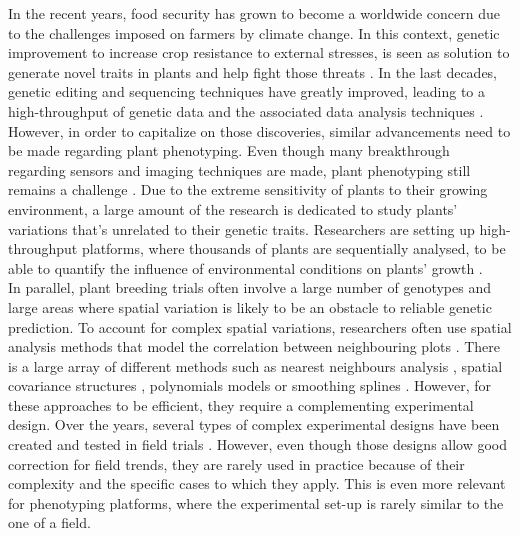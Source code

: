 
In the recent years, food security has grown to become a worldwide concern due to the challenges imposed on farmers by climate change. 
In this context, genetic improvement to increase crop resistance to external stresses, is seen as solution to generate novel traits in plants and help fight those threats \parencite{tester2010breeding}. 
In the last decades, genetic editing and sequencing techniques have greatly improved, leading to a high-throughput of genetic data and the associated data analysis techniques \parencite{schiml2016revolutionizing}. 
However, in order to capitalize on those discoveries, similar advancements need to be made regarding plant phenotyping. 
Even though many breakthrough regarding sensors and imaging techniques are made, plant phenotyping still remains a challenge \parencite{furbank_phenomics_2011}. Due to the extreme sensitivity of plants to their growing environment, a large amount of the research is dedicated to study plants' variations that's unrelated to their genetic traits. Researchers are setting up high-throughput platforms, where thousands of plants are sequentially analysed, to be able to quantify the influence of environmental conditions on plants' growth \parencite{tardieu_plant_2017}.\\

In parallel, plant breeding trials often involve a large number of genotypes and large areas where spatial variation is likely to be an obstacle to reliable genetic prediction. To account for complex spatial variations, researchers often use spatial analysis methods that model the correlation between neighbouring plots \parencite{velazco_modelling_2017}. There is a large array of different methods such as nearest neighbours analysis \parencite{wilkinson_nearest_1983}, spatial covariance structures \parencite{gilmour_accounting_1997,piepho_linear_2010}, polynomials models \parencite{federer1998recovery} or smoothing splines \parencite{durban_adjusting_2001}. However, for these approaches to be efficient, they require a complementing experimental design. Over the years, several types of complex experimental designs have been created and tested in field trials \parencite{yates_comparative_1939,patterson_efficiency_1983,cullis_design_2006}. However, even though those designs allow good correction for field trends, they are rarely used in practice because of their complexity and the specific cases to which they apply. This is even more relevant for phenotyping platforms, where the experimental set-up is rarely similar to the one of a field.\\ 

